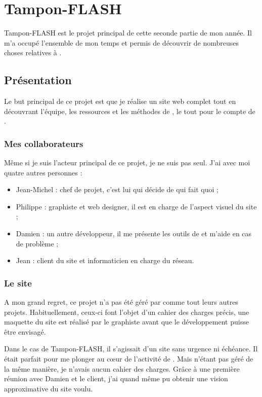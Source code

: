 \chapter{Tampon-FLASH}
Tampon-FLASH est le projet principal de cette seconde partie de mon année. Il m'a occupé l'ensemble de mon temps et permis de découvrir de nombreuses choses relatives à \fidit.

\section{Présentation}
Le but principal de ce projet est que je réalise un site web complet tout en découvrant l'équipe, les ressources et les méthodes de \fidit, le tout pour le compte de \solulog.

\subsection{Mes collaborateurs}
Même si je suis l'acteur principal de ce projet, je ne suis pas seul. J'ai avec moi quatre autres personnes :
\begin{itemize}
	\item Jean-Michel  : chef de projet, c'est lui qui décide de qui fait quoi ;
	\item Philippe  : graphiste et web designer, il est en charge de l'aspect visuel du site ;
	\item Damien  : un autre développeur, il me présente les outils de \fidit{} et m'aide en cas de problème ;
	\item Jean  : client du site et informaticien en charge du réseau.
\end{itemize}

\subsection{Le site}
A mon grand regret, ce projet n'a pas été géré par \fidit{} comme tout leurs autres projets. Habituellement, ceux-ci font l'objet d'un cahier des charges précis, une maquette du site est réalisé par le graphiste avant que le développement puisse être envisagé.

Dans le cas de Tampon-FLASH, il s'agissait d'un site sans urgence ni échéance. Il était parfait pour me plonger au cœur de l'activité de \fidit. Mais n'étant pas géré de la même manière, je n'avais aucun cahier des charges. Grâce à une première réunion avec Damien et le client, j'ai quand même pu obtenir une vision approximative du site voulu.

